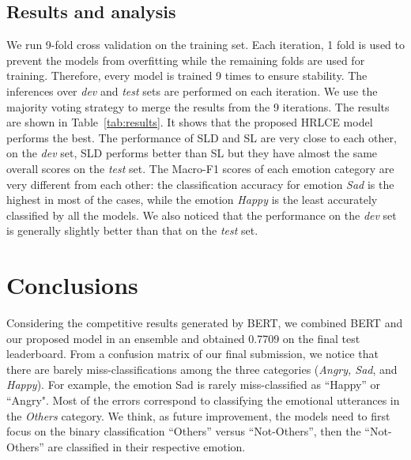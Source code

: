 \documentclass[11pt,a4paper]{article}
\begin{document}
\subsection{Results and analysis}
We run 9-fold cross validation on the training set. Each iteration, 1 fold is used to prevent the models from overfitting while the remaining folds are used for training. Therefore, every model is trained 9 times to ensure  stability. The inferences over \emph{dev} and \emph{test} sets are performed on each iteration. We use the majority voting strategy to merge the results from the 9 iterations. The results are shown in Table~\ref{tab:results}. It shows that the proposed HRLCE model performs the best.
The performance of SLD and SL are very close to each other, on the \emph{dev} set, SLD performs better than SL but they have almost the same overall scores on the \emph{test} set. The Macro-F1 scores of each emotion category are very different from each other: the classification accuracy for emotion \emph{Sad} is the highest in most of the cases, while the emotion \emph{Happy} is the least accurately classified by all the models. We also noticed that the performance on the \emph{dev} set is generally slightly better than that on the \emph{test} set. 

\section{Conclusions}
Considering the competitive results generated by BERT, we combined BERT and our proposed model in an ensemble and obtained 0.7709 on the final test leaderboard.
From a confusion matrix of our final submission, we notice that there are barely miss-classifications among the three categories  (\emph{Angry, Sad}, and \emph{Happy}). For example, the emotion Sad is rarely miss-classified as ``Happy'' or ``Angry".  
Most of the errors correspond to classifying the emotional utterances in the \emph{Others} category.
We think, as future improvement, the models need to first focus on the binary classification ``Others'' versus ``Not-Others'', then the ``Not-Others'' are classified in their respective emotion. 

\newpage



\end{document}
